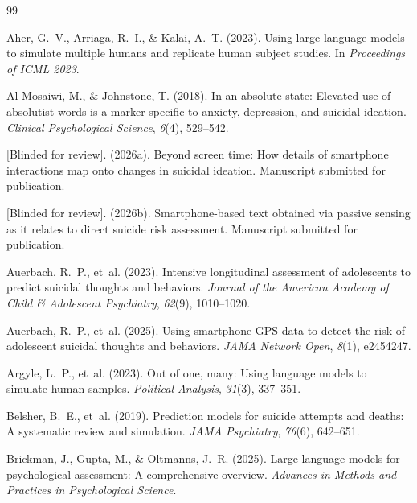 \documentclass[review,12pt,authoryear]{elsarticle}
\begin{document}
\begin{thebibliography}{99}

Aher, G.~V., Arriaga, R.~I., \& Kalai, A.~T. (2023).
\newblock Using large language models to simulate multiple humans and replicate human subject studies.
\newblock In \textit{Proceedings of ICML 2023}.

Al-Mosaiwi, M., \& Johnstone, T. (2018).
\newblock In an absolute state: {E}levated use of absolutist words is a marker specific to anxiety, depression, and suicidal ideation.
\newblock \textit{Clinical Psychological Science}, \textit{6}(4), 529--542.

[Blinded for review]. (2026a).
\newblock Beyond screen time: {H}ow details of smartphone interactions map onto changes in suicidal ideation.
\newblock Manuscript submitted for publication.

[Blinded for review]. (2026b).
\newblock Smartphone-based text obtained via passive sensing as it relates to direct suicide risk assessment.
\newblock Manuscript submitted for publication.

Auerbach, R.~P., et~al. (2023).
\newblock Intensive longitudinal assessment of adolescents to predict suicidal thoughts and behaviors.
\newblock \textit{Journal of the American Academy of Child \& Adolescent Psychiatry}, \textit{62}(9), 1010--1020.

Auerbach, R.~P., et~al. (2025).
\newblock Using smartphone {GPS} data to detect the risk of adolescent suicidal thoughts and behaviors.
\newblock \textit{JAMA Network Open}, \textit{8}(1), e2454247.

Argyle, L.~P., et~al. (2023).
\newblock Out of one, many: {U}sing language models to simulate human samples.
\newblock \textit{Political Analysis}, \textit{31}(3), 337--351.

Belsher, B.~E., et~al. (2019).
\newblock Prediction models for suicide attempts and deaths: {A} systematic review and simulation.
\newblock \textit{JAMA Psychiatry}, \textit{76}(6), 642--651.

Brickman, J., Gupta, M., \& Oltmanns, J.~R. (2025).
\newblock Large language models for psychological assessment: {A} comprehensive overview.
\newblock \textit{Advances in Methods and Practices in Psychological Science}.


\end{thebibliography}
\end{document}
